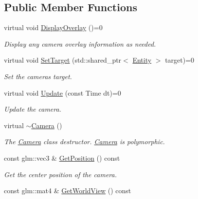 \subsection*{Public Member Functions}
\begin{DoxyCompactItemize}
\item 
virtual void \hyperlink{class_f_l_i_g_h_t_1_1_camera_a6f89b703cf9e2e94ab9c33a4200e0a10}{Display\+Overlay} ()=0
\begin{DoxyCompactList}\small\item\em Display any camera overlay information as needed. \end{DoxyCompactList}\item 
virtual void \hyperlink{class_f_l_i_g_h_t_1_1_camera_a9141e385388725340f06982d5f606396}{Set\+Target} (std\+::shared\+\_\+ptr$<$ \hyperlink{class_f_l_i_g_h_t_1_1_entity}{Entity} $>$ target)=0
\begin{DoxyCompactList}\small\item\em Set the camera\textquotesingle{}s target. \end{DoxyCompactList}\item 
virtual void \hyperlink{class_f_l_i_g_h_t_1_1_camera_ad634b11d30c62bacf29d7d7bf13d3f0c}{Update} (const Time dt)=0
\begin{DoxyCompactList}\small\item\em Update the camera. \end{DoxyCompactList}\item 
\mbox{\label{class_f_l_i_g_h_t_1_1_camera_ab09bbb52a6b79bf1eadb7605ffc46aab}} 
virtual \hyperlink{class_f_l_i_g_h_t_1_1_camera_ab09bbb52a6b79bf1eadb7605ffc46aab}{$\sim$\+Camera} ()
\begin{DoxyCompactList}\small\item\em The \hyperlink{class_f_l_i_g_h_t_1_1_camera}{Camera} class\textquotesingle{} destructor. \hyperlink{class_f_l_i_g_h_t_1_1_camera}{Camera} is polymorphic. \end{DoxyCompactList}\item 
const glm\+::vec3 \& \hyperlink{class_f_l_i_g_h_t_1_1_camera_ac29531b049cf048aeb0470a45361fc99}{Get\+Position} () const
\begin{DoxyCompactList}\small\item\em Get the center position of the camera. \end{DoxyCompactList}\item 
const glm\+::mat4 \& \hyperlink{class_f_l_i_g_h_t_1_1_camera_a7f4809df50e4a319fd93de1aad6660c8}{Get\+World\+View} () const

\end{DoxyCompactItemize}
